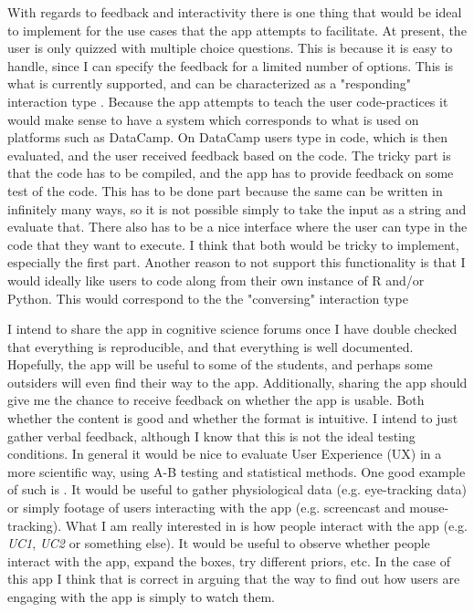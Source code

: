 \documentclass[12pt]{article}
\begin{document}
With regards to feedback and interactivity there is one thing that would be ideal
to implement for the use cases that the app attempts to facilitate. At present,
the user is only quizzed with multiple choice questions. This is because it is easy
to handle, since I can specify the feedback for a limited number of options.
This is what is currently supported, and can be characterized as a
"responding" interaction type \autocite[81]{rogers2011interaction}.
Because the app attempts to teach the user code-practices it would make sense to
have a system which corresponds to what is used on platforms such as DataCamp.
On DataCamp users type in code, which is then evaluated, and the user received feedback
based on the code. The tricky part is that the code has to be compiled,
and the app has to provide feedback on some test of the code. This has to be
done part because the same can be written in infinitely many ways,
so it is not possible simply to take the input as a string and evaluate that.
There also has to be a nice interface where the user can type in the code that
they want to execute. I think that both would be tricky to implement, especially the
first part. Another reason to not support this functionality is that I would ideally
like users to code along from their own instance of R and/or Python. This would
correspond to the the "conversing" interaction type
\autocite[81]{rogers2011interaction}

\vspace{5mm}

I intend to share the app in cognitive science forums once I have double checked
that everything is reproducible, and that everything is well documented. Hopefully,
the app will be useful to some of the students, and perhaps some outsiders will even
find their way to the app. Additionally, sharing the app should give me the chance
to receive feedback on whether the app is usable. Both whether the content is good
and whether the format is intuitive. I intend to just gather verbal feedback,
although I know that this is not the ideal testing conditions.
In general it would be nice to evaluate User Experience (UX) in a more
scientific way, using A-B testing and statistical methods. One good example
of such is \textcite{sutcliffe2016}.
It would be useful to gather physiological data (e.g. eye-tracking data)
or simply footage of users interacting with the app (e.g. screencast and mouse-tracking).
What I am really interested in is how people interact with the app
(e.g. \emph{UC1}, \emph{UC2} or something else).
It would be useful to observe whether people interact
with the app, expand the boxes, try different priors, etc.
In the case of this app I think that \textcite{norman1999} is correct
in arguing that the way to find out how users are engaging with the app
is simply to watch them.
\end{document}
